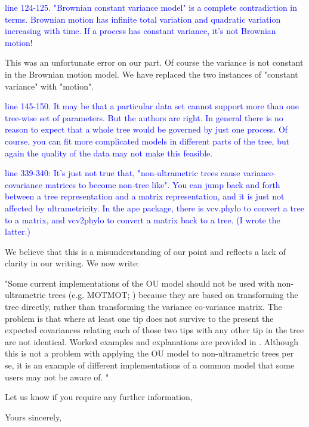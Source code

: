 \documentclass[12pt]{letter}
\begin{document}
\begin{letter}{}
\textcolor{blue}{line 124-125. "Brownian constant variance model" is a complete contradiction in terms. Brownian motion has infinite total variation and quadratic variation increasing with time. If a process has constant variance, it's not Brownian motion!}

This was an unfortunate error on our part. Of course the variance is not constant in the Brownian motion model. We have replaced the two instances of "constant variance" with "motion".

\textcolor{blue}{line 145-150. It may be that a particular data set cannot support more than one tree-wise set of parameters. But the authors are right. In general there is no reason to expect that a whole tree would be governed by just one process. Of course, you can fit more complicated models in different parts of the tree, but again the quality of the data may not make this feasible.}

\textcolor{blue}{line 339-340: It's just not true that, "non-ultrametric trees cause variance-covariance matrices to become non-tree like". You can jump back and forth between a tree representation and a matrix representation, and it is just not affected by ultrametricity. In the ape package, there is vcv.phylo to convert a tree to a matrix, and vcv2phylo to convert a matrix back to a tree. (I wrote the latter.)}

We believe that this is a misunderstanding of our point and reflects a lack of clarity in our writing. We now write: 

"Some current implementations of the OU model should not be used with non-ultrametric trees (e.g. MOTMOT; \citealp{Thomas:2011aa}) because they are based on transforming the tree directly, rather than transforming the variance co-variance matrix. The problem is that where at least one tip does not survive to the present the expected covariances relating each of those two tips with any other tip in the tree are not identical. Worked examples and explanations are provided in \citep{slater2014correction}. Although this is not a problem with applying the OU model to non-ultrametric trees per se, it is an example of different implementations of a common model that some users may not be aware of. "

Let us know if you require any further information,

\closing{Yours sincerely,}

\end{letter}
\end{document}
